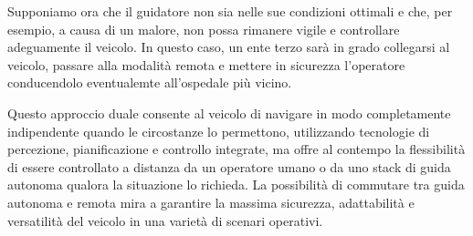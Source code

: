 \noindent Supponiamo ora che il guidatore non sia nelle sue condizioni ottimali e che, per esempio, a causa di un malore, non possa rimanere vigile e controllare adeguamente il veicolo. In questo caso, un ente terzo sarà in grado collegarsi al veicolo, passare alla modalità remota e mettere in sicurezza l'operatore conducendolo eventualemte all'ospedale più vicino.

\noindent Questo approccio duale consente al veicolo di navigare in modo completamente indipendente quando le circostanze lo permettono, utilizzando tecnologie di percezione, pianificazione e controllo integrate, ma offre al contempo la flessibilità di essere controllato a distanza da un operatore umano o da uno stack di guida autonoma qualora la situazione lo richieda. La possibilità di commutare tra guida autonoma e remota mira a garantire la massima sicurezza, adattabilità e versatilità del veicolo in una varietà di scenari operativi.

